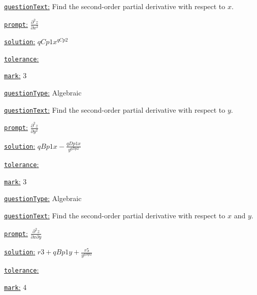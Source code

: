 \documentclass[preview]{standalone}
\newcommand \fieldname[1]{\underline{\texttt{#1}:}}
\begin{document}
\fieldname{questionText}
Find the second-order partial derivative with respect to $x$.

\fieldname{prompt}
$\frac{\partial^2 z}{\partial x^2}$

\fieldname{solution}
${qCp1}x^{qCp2}$

\fieldname{tolerance}


\fieldname{mark}
3

\fieldname{questionType}
Algebraic

\fieldname{questionText}
Find the second-order partial derivative with respect to $y$.

\fieldname{prompt}
$\frac{\partial^2 z}{\partial y^2}$

\fieldname{solution}
${qBp1}x - \frac{{qDp1}x}{y^{qDp2}}$

\fieldname{tolerance}


\fieldname{mark}
3

\fieldname{questionType}
Algebraic

\fieldname{questionText}
Find the second-order partial derivative with respect to $x$ and $y$.

\fieldname{prompt}
$\frac{\partial^2 z}{\partial x \partial y}$

\fieldname{solution}
${r3} + {qBp1}y + \frac{{r5}}{y^{qBp2}}$

\fieldname{tolerance}


\fieldname{mark}
4

\end{document}
